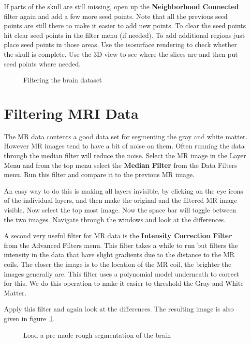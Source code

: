 \documentclass[fleqn,11pt,openany]{book}
\begin{document}
If parts of the skull are still missing, open up the {\bf Neighborhood Connected} filter again and add a few more seed points. Note that all the previous seed points are still there to make it easier to add new points. To clear the seed points hit clear seed points in the filter menu (if needed). To add additional regions just place seed points in those areas. Use the isosurface rendering to check whether the skull is complete. Use the 3D view to see where the slices are and then put seed points where needed.


\begin{figure}
\caption{Filtering the brain dataset}\label{fig:Median-ImageCorrected}
\end{figure}


\section{Filtering MRI Data}

The MR data contents a good data set for segmenting the gray and white matter. However MR images  tend to have a bit of noise on them. Often running the data through the median filter will reduce the noise. Select the MR image in the Layer Menu and  from the top menu select the {\bf Median Filter} from the Data Filters menu. Run this filter and compare it to the previous MR image.

An easy way to do this is making all layers invisible, by clicking on the eye icons of the individual layers, and then make the original and the filtered MR image visible. Now select the top most image. Now the space bar will toggle between the two images. Navigate through the windows and look at the differences.

A second very useful filter for MR data is the {\bf Intensity Correction Filter} from the Advanced Filters menu. This filter takes a while to run  but filters the intensity in the data that have slight gradients due to the distance to the MR coils. The closer the image is to the location of the MR coil, the brighter the images generally are. This filter uses a polynomial model underneath to correct for this. We do this operation to make it easier to threshold the Gray and White Matter.

Apply this filter and again look at the differences. The resulting image is also given in figure~\ref{fig:Median-ImageCorrected}. 

\begin{figure}
\caption{Load a pre-made rough segmentation of the brain}\label{fig:LoadingSegmentation}
\end{figure}
\end{document}
